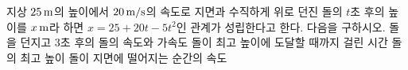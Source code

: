 지상 $25\mkern3mu \mathrm{m}$의 높이에서 $20\mkern3mu \mathrm{m/s}$의 속도로 지면과 수직하게 위로 던진 돌의 $t$초 후의 높이를 $x\mkern3mu \mathrm{m}$라 하면 $x=25+20t-5t^2$인 관계가 성립한다고 한다. 다음을 구하시오.
 돌을 던지고 $3$초 후의 돌의 속도와 가속도
 돌이 최고 높이에 도달할 때까지 걸린 시간
 돌의 최고 높이
 돌이 지면에 떨어지는 순간의 속도
